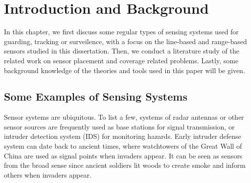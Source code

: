 
\chapter{Introduction and Background} 
\thispagestyle{myheadings} 
In this chapter, we first discuss some regular types of sensing systems 
used for guarding, tracking or surveilence, 
with a focus on the line-based and range-based sensors studied in this dissertation. 
Then, we conduct a literature study of the related work on sensor placement and 
coverage related problems. 
Lastly, some background knowledge of the theories and tools used in this paper will be given. 
\section{Some Examples of Sensing Systems} 
Sensor systems are ubiquitous. To list a few, systems of radar antennas 
or other sensor sources are frequently used as base stations for signal transmission, 
or intruder detection system (IDS) for monitoring hazards. 
Early intruder defense system can date back to ancient times, where 
watchtowers of the Great Wall of China are used as signal points when invaders appear. 
It can be seen as sensors from the broad sense 
since ancient soldiers lit woods to create smoke and inform others when invaders appear. 
